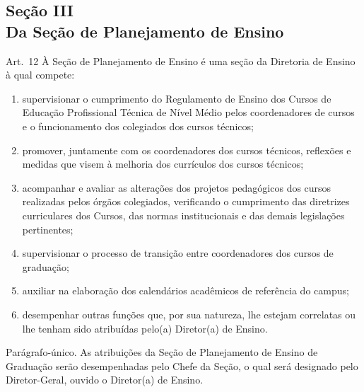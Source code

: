 \documentclass[a4paper,12pt]{report}
\begin{document}
\subsection{Seção III \\ Da Seção de Planejamento de Ensino}

Art.~12 À Seção de Planejamento de Ensino é uma seção da Diretoria de Ensino à qual compete:

\begin{enumerate}
\renewcommand{\labelenumi}{\Roman{enumi}}

\item supervisionar o cumprimento do Regulamento de Ensino dos Cursos de Educação 
      Profissional Técnica de Nível Médio pelos coordenadores de cursos e o funcionamento 
      dos colegiados dos cursos técnicos;

\item promover, juntamente com os coordenadores dos cursos técnicos, reflexões e medidas
      que visem à melhoria dos currículos dos cursos técnicos;
      
\item acompanhar e avaliar as alterações dos projetos pedagógicos dos cursos realizadas 
      pelos órgãos colegiados, verificando o cumprimento das diretrizes curriculares dos 
      Cursos, das normas institucionais e das demais legislações pertinentes;
        
\item supervisionar o processo de transição entre coordenadores dos cursos de graduação;

\item auxiliar na elaboração dos calendários acadêmicos de referência do campus;

\item desempenhar outras funções que, por sua natureza, lhe estejam correlatas ou lhe 
      tenham sido atribuídas pelo(a) Diretor(a) de Ensino.
\end{enumerate}

Parágrafo-único. As atribuições da Seção de Planejamento de Ensino de Graduação serão 
desempenhadas pelo Chefe da Seção, o qual será designado pelo Diretor-Geral, ouvido 
o Diretor(a) de Ensino.

\end{document}
